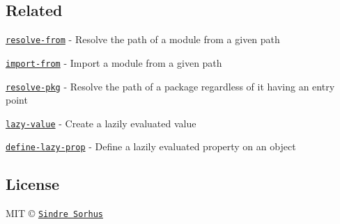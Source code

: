 \subsection*{Related}


\begin{DoxyItemize}
\item \href{https://github.com/sindresorhus/resolve-from}{\tt resolve-\/from} -\/ Resolve the path of a module from a given path
\item \href{https://github.com/sindresorhus/import-from}{\tt import-\/from} -\/ Import a module from a given path
\item \href{https://github.com/sindresorhus/resolve-pkg}{\tt resolve-\/pkg} -\/ Resolve the path of a package regardless of it having an entry point
\item \href{https://github.com/sindresorhus/lazy-value}{\tt lazy-\/value} -\/ Create a lazily evaluated value
\item \href{https://github.com/sindresorhus/define-lazy-prop}{\tt define-\/lazy-\/prop} -\/ Define a lazily evaluated property on an object
\end{DoxyItemize}

\subsection*{License}

M\+IT © \href{https://sindresorhus.com}{\tt Sindre Sorhus} 